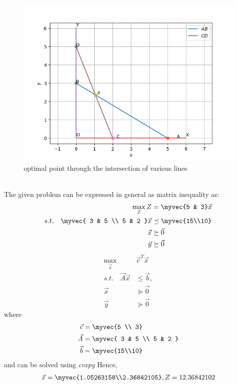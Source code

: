 \begin{figure}[h]
\includegraphics[width=\columnwidth]{Figure_1.png}
\caption{optimal point through the intersection of various lines}
\label{eq:solutions/4/5/fig:Figure_1}
\end{figure}\\
The given problem can be expressed in general as matrix inequality as:
\begin{align}
\max_{\vec{x}} Z &= \myvec{5 & 3}\vec{x}
\\
s.t. \quad 
\myvec{
3 & 5
\\
5 & 2
}
\vec{x} &\preceq \myvec{15\\10}
\\
\vec{x} &\succeq \vec{0}\\
\vec{y} &\succeq \vec{0}
\end{align}
\begin{align}
\max_{\vec{x}} &\vec{c}^{T}\vec{x}
\\
s.t. \quad \vec{A}\vec{x} &\le \vec{b},
\\
\vec{x} &\succeq\vec{0}\\
\vec{y} &\succeq \vec{0}
\end{align}
%
where
\begin{align}
\vec{c} &= \myvec{5 \\ 3}
\\
\vec{A} &=
\myvec{
3 & 5
\\
5 & 2
}
\\
\vec{b}&=\myvec{15\\10}
%
\end{align}
%
and can be solved using {\em cvxpy} 
Hence,
\begin{align}
\vec{x} = \myvec{1.05263158\\2.36842105}, Z = 12.36842102
\end{align}

